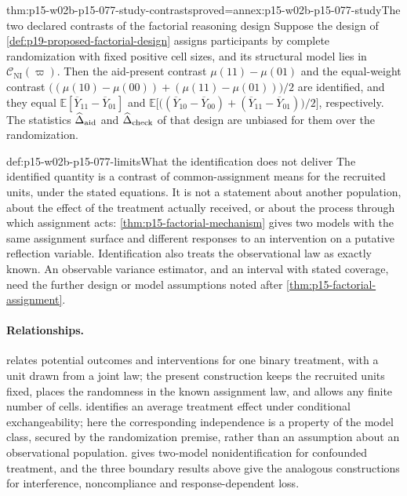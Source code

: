 \begin{hbcorollary}{thm:p15-w02b-p15-077-study-contrasts}{proved=annex:p15-w02b-p15-077-study}{The two declared contrasts of the factorial reasoning design}
Suppose the design of \cref{def:p19-proposed-factorial-design} assigns
participants by complete randomization with fixed positive cell sizes, and
its structural model lies in \(\mathcal C_{\mathrm{NI}}(\varpi)\).
Then the aid-present contrast \(\mu(11)-\mu(01)\) and the equal-weight
contrast \(\bigl((\mu(10)-\mu(00))+(\mu(11)-\mu(01))\bigr)/2\) are
identified, and they equal
\(\mathbb E[\overline Y_{11}-\overline Y_{01}]\) and
\(\mathbb E\bigl[\bigl((\overline Y_{10}-\overline Y_{00})
 +(\overline Y_{11}-\overline Y_{01})\bigr)/2\bigr]\), respectively.
The statistics \(\widehat\Delta_{\rm aid}\) and
\(\widehat\Delta_{\rm check}\) of that design are unbiased for them over
the randomization.
\end{hbcorollary}

\begin{hbwarning}{def:p15-w02b-p15-077-limits}{What the identification does not deliver}
The identified quantity is a contrast of common-assignment means for the
recruited units, under the stated equations. It is not a statement about
another population, about the effect of the treatment actually received, or
about the process through which assignment acts:
\cref{thm:p15-factorial-mechanism} gives two models with the same
assignment surface and different responses to an intervention on a
putative reflection variable. Identification also treats the observational
law as exactly known. An observable variance estimator, and an interval
with stated coverage, need the further design or model assumptions noted
after \cref{thm:p15-factorial-assignment}.
\end{hbwarning}

\paragraph{Relationships.}
 relates potential outcomes and
interventions for one binary treatment, with a unit drawn from a joint law;
the present construction keeps the recruited units fixed, places the
randomness in the known assignment law, and allows any finite number of
cells.  identifies an average
treatment effect under conditional exchangeability; here the corresponding
independence is a property of the model class, secured by the
randomization premise, rather than an assumption about an observational
population.  gives two-model
nonidentification for confounded treatment, and the three boundary results
above give the analogous constructions for interference, noncompliance and
response-dependent loss.
